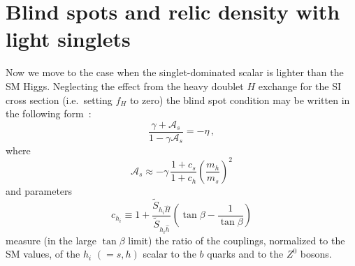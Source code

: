 \documentclass[12pt,twoside]{article}
\begin{document}
\section{Blind spots  and relic density with light singlets
\label{sec:bs_fhs}}





\vspace{2ex}
\noindent
Now we move to the case when the singlet-dominated scalar is lighter than 
the SM Higgs. Neglecting the effect from the heavy doublet $H$ exchange 
for the SI cross section (i.e.\ setting $f_H$ to zero) 
the blind spot condition may be written in the following form~\cite{BS_NMSSM}:
%
\begin{equation}
\label{bs_fhs_mix}
\frac{\gamma+\mathcal{A}_s}{1-\gamma\mathcal{A}_s}=-\eta\,,
\end{equation}
% 
where
%
\begin{equation}
\label{eq:As}
\mathcal{A}_s\approx
-\gamma\,\frac{1+c_s}{1+c_h}\left(\frac{m_h}{m_s}\right)^2
\end{equation}
and parameters
%
\begin{equation}
\label{c}
c_{h_i}\equiv1+\frac{\tilde{S}_{{h_i}\hat{H}}}{\tilde{S}_{{h_i}\hat{h}}}
\left(\tan\beta-\frac{1}{\tan\beta}\right)
\end{equation}
%
measure (in the large $\tan\beta$ limit) the ratio of the couplings, 
normalized to the SM values, of the $h_i$ $(=s,h)$ scalar to the $b$ quarks 
and to the $Z^0$ bosons.
\end{document}

